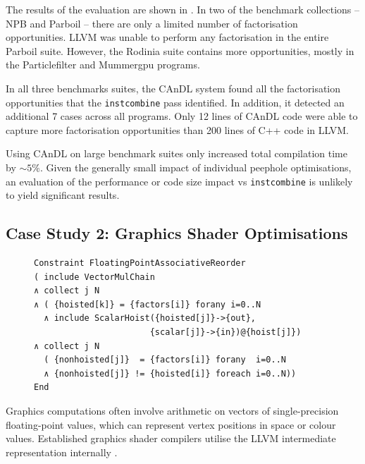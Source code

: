     The results of the evaluation are shown in
    .
    In two of the benchmark collections -- NPB and Parboil -- there are
    only a limited number of factorisation opportunities.
    LLVM was unable to perform any factorisation in the entire Parboil suite.
    However, the Rodinia suite contains more opportunities, mostly in the
    Particlefilter and Mummergpu programs.

    In all three benchmarks suites, the CAnDL system found all the factorisation
    opportunities that the \texttt{instcombine} pass identified.
    In addition, it detected an additional 7 cases across all programs.
    Only 12 lines of CAnDL code were able to capture more factorisation
    opportunities than 200 lines of C++ code in LLVM.

    Using CAnDL on large benchmark suites only increased total compilation time
    by \mbox{$\sim5\%$}.
    Given the generally small impact of individual peephole optimisations, an
    evaluation of the performance or code size impact vs {\tt instcombine} is
    unlikely to yield significant results.

\subsection{Case Study 2: Graphics Shader Optimisations}

\begin{figure}[t]
\begin{lstlisting}[language=CAnDL,label={fig:Lewis},caption=
   {CAnDL defines multiplication chains involving genuine vectors and hoisted
    scalars:
    After separating the two cases, some of the multiplications can be performed
    on scalars instead.\parfillskip=0pt}]
Constraint FloatingPointAssociativeReorder
( include VectorMulChain
∧ collect j N
∧ ( {hoisted[k]} = {factors[i]} forany i=0..N
  ∧ include ScalarHoist({hoisted[j]}->{out},
                       {scalar[j]}->{in})@{hoist[j]})
∧ collect j N
  ( {nonhoisted[j]}  = {factors[i]} forany  i=0..N
  ∧ {nonhoisted[j]} != {hoisted[i]} foreach i=0..N))
End
\end{lstlisting}
\end{figure}

    Graphics computations often involve arithmetic on vectors of
    single-precision floating-point values, which can represent vertex positions
    in space or colour values.
    Established graphics shader compilers utilise the LLVM intermediate
    representation internally \citep{cudacompiler}.

